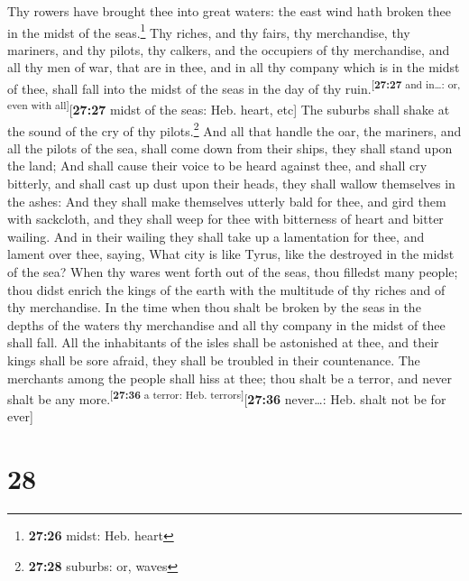  Thy rowers have brought thee into great waters: the east
wind hath broken thee in the midst of the seas.\footnote{\textbf{27:26}
  midst: Heb. heart}  Thy riches, and thy fairs, thy
merchandise, thy mariners, and thy pilots, thy calkers, and the
occupiers of thy merchandise, and all thy men of war, that are in thee,
and in all thy company which is in the midst of thee, shall fall into
the midst of the seas in the day of thy
ruin.\textsuperscript{{[}\textbf{27:27} and in\ldots: or, even with
all{]}}{[}\textbf{27:27} midst of the seas: Heb. heart, etc{]}
 The suburbs shall shake at the sound of the cry of thy
pilots.\footnote{\textbf{27:28} suburbs: or, waves}  And
all that handle the oar, the mariners, and all the pilots of the sea,
shall come down from their ships, they shall stand upon the land;
 And shall cause their voice to be heard against thee,
and shall cry bitterly, and shall cast up dust upon their heads, they
shall wallow themselves in the ashes:  And they shall
make themselves utterly bald for thee, and gird them with sackcloth, and
they shall weep for thee with bitterness of heart and bitter wailing.
 And in their wailing they shall take up a lamentation
for thee, and lament over thee, saying, What city is like Tyrus, like
the destroyed in the midst of the sea?  When thy wares
went forth out of the seas, thou filledst many people; thou didst enrich
the kings of the earth with the multitude of thy riches and of thy
merchandise.  In the time when thou shalt be broken by
the seas in the depths of the waters thy merchandise and all thy company
in the midst of thee shall fall.  All the inhabitants of
the isles shall be astonished at thee, and their kings shall be sore
afraid, they shall be troubled in their countenance.  The
merchants among the people shall hiss at thee; thou shalt be a terror,
and never shalt be any more.\textsuperscript{{[}\textbf{27:36} a terror:
Heb. terrors{]}}{[}\textbf{27:36} never\ldots: Heb. shalt not be for
ever{]}

\hypertarget{section-27}{%
\section{28}\label{section-27}}

